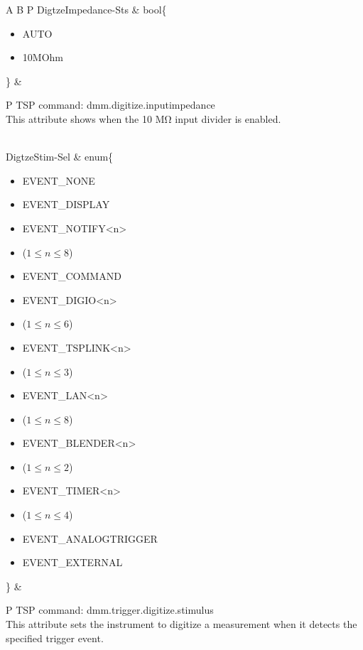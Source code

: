 \documentclass[openany]{article}
\begin{document}
\begin{longtable}{A B P}
		DigtzeImpedance-Sts & bool\{\begin{itemize}[noitemsep]
					\small
					\item[] AUTO
					\item[] 10MOhm
				\end{itemize}\} & 
				\begin{tabular}{P}
					TSP command: dmm.digitize.inputimpedance \\
					This attribute shows when the 10 MΩ input divider is enabled.
				\end{tabular} \\ \hline
		DigtzeStim-Sel & enum\{\begin{itemize}[noitemsep]
					\small
					\item[] EVENT\_NONE
					\item[] EVENT\_DISPLAY
					\item[] EVENT\_NOTIFY\textless n\textgreater
					\item[] ($1\leq n\leq 8$)
					\item[] EVENT\_COMMAND
					\item[] EVENT\_DIGIO\textless n\textgreater
					\item[] ($1\leq n\leq 6$)
					\item[] EVENT\_TSPLINK\textless n\textgreater
					\item[] ($1\leq n\leq 3$)
					\item[] EVENT\_LAN\textless n\textgreater
					\item[] ($1\leq n\leq 8$)
					\item[] EVENT\_BLENDER\textless n\textgreater 
					\item[] ($1\leq n\leq 2$)
					\item[] EVENT\_TIMER\textless n\textgreater
					\item[] ($1\leq n\leq 4$)
					\item[] EVENT\_ANALOGTRIGGER
					\item[] EVENT\_EXTERNAL
				\end{itemize}\} & 
				\begin{tabular}{P}
					TSP command: dmm.trigger.digitize.stimulus \\
					This attribute sets the instrument to digitize a measurement when it detects the specified trigger event.
				\end{tabular} \\


\end{longtable}
\end{document}
